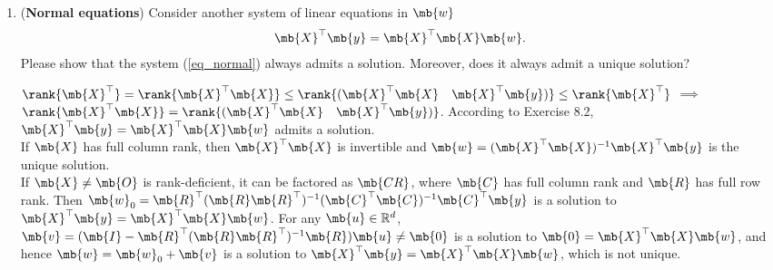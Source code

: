 \begin{exercise}
\begin{enumerate}
		\item (\textbf{Normal equations}) Consider  another system of linear equations in $\mb{w}$
			\begin{align}\label{eq_normal}
				\mb{X}^{\top}\mb{y} = \mb{X}^{\top}\mb{X}\mb{w}.
			\end{align}
			Please show that the system (\ref{eq_normal}) always admits a solution. Moreover, does it always admit a unique solution?

			\begin{solution}
				$\rank{\mb{X}^\top}=\rank{\mb{X}^\top\mb{X}}\leq\rank{(\mb{X}^\top\mb{X} \quad \mb{X}^\top\mb{y})}\leq\rank{\mb{X}^\top}$ $\implies$ $\rank{\mb{X}^\top\mb{X}}=\rank{(\mb{X}^\top\mb{X} \quad \mb{X}^\top\mb{y})}$. According to Exercise 8.2, $\mb{X}^\top\mb{y} = \mb{X}^\top\mb{X}\mb{w}$ admits a solution.\\
				If $\mb{X}$ has full column rank, then $\mb{X}^\top\mb{X}$ is invertible and $\mb{w} = (\mb{X}^\top\mb{X})^{-1}\mb{X}^\top\mb{y}$ is the unique solution. \\
				If $\mb{X}\neq\mb{O}$ is rank-deficient, it can be factored as $\mb{CR}$, where $\mb{C}$ has full column rank and $\mb{R}$ has full row rank. Then $\mb{w}_0=\mb{R}^\top(\mb{R}\mb{R}^\top)^{-1}(\mb{C}^\top\mb{C})^{-1}\mb{C}^\top\mb{y}$ is a solution to $\mb{X}^\top\mb{y} = \mb{X}^\top\mb{X}\mb{w}$. For any $\mb{u}\in\mathbb{R}^d$, $\mb{v}=(\mb{I}-\mb{R}^\top(\mb{R}\mb{R}^\top)^{-1}\mb{R})\mb{u}\neq\mb{0}$ is a solution to $\mb{0} = \mb{X}^\top\mb{X}\mb{w}$, and hence $\mb{w}=\mb{w}_0+\mb{v}$ is a solution to $\mb{X}^\top\mb{y} = \mb{X}^\top\mb{X}\mb{w}$, which is not unique.
				\qedhere
			\end{solution}

	\end{enumerate}
\end{exercise}


